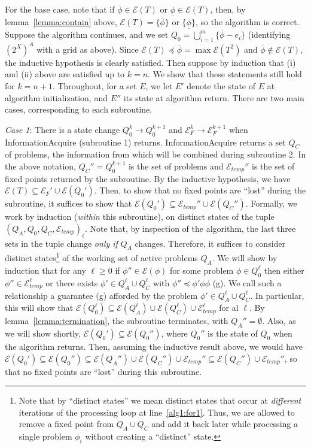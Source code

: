 \documentclass[11pt,reqno]{amsart}
\theoremstyle{definition}
\numberwithin{equation}{section}
\newcommand{\ol}{\overline}
\newcommand{\ul}{\underline}
\newcommand{\pre}{\phi}
\newcommand{\prealloc}{(2^X)^A}
\newcommand{\sub}{\subseteq}
\newcommand{\fix}{\mathcal{E}}
\newcommand{\peq}{\preceq}
\newcommand{\toppre}{\ol{\pre}}
\newcommand{\acto}{Q_0}
\newcommand{\actok}{Q_0^k}
\newcommand{\acta}{Q_A}
\newcommand{\actc}{Q_C}
\newcommand{\fixfind}{\mathcal{E}_F}
\newcommand{\fixfindk}{\mathcal{E}^k_F}
\newcommand{\fixfindkk}{\mathcal{E}^{k + 1}_F}
\newcommand{\fixtemp}{\mathcal{E}_{temp}}
\begin{document}
\begin{enumerate}
For the base case, note that if $\toppre \in \fix(T)$ or $\ul{\pre} \in \fix(T)$, then, by lemma~\ref{lemma:contain} above, $\fix(T) = \{\toppre\}$ or $\{\ul{\pre}\}$, so the algorithm is correct. 
Suppose the algorithm continues, and we set $\acto = \bigcup_{i = 1}^m \{\toppre - e_i\}$ (identifying $\prealloc$ with a grid as above).
Since $\fix(T) \peq \toppre = \max \fix(T^2)$ and $\toppre \not \in \fix(T)$, the inductive hypothesis is clearly satisfied. 
Then suppose by induction that (i) and (ii) above are satisfied up to $k = n$.
We show that these statements still hold for $k = n +1$.
Throughout, for a set $E$, we let $E'$ denote the state of $E$ at algorithm initialization, and $E''$ its state at algorithm return.
There are two main cases, corresponding to each subroutine.

\emph{Case 1}: There is a state change $\actok \to \acto^{k +1}$ and $\fixfindk \to \fixfindkk$ when InformationAcquire (subroutine 1) returns.
InformationAcquire returns a set $\actc$ of problems, the information from which will be combined during subroutine 2.
In the above notation, $\actc'' = \acto^{k+1}$ is the set of problems and $\fixtemp''$ is the set of fixed points returned by the subroutine.
By the inductive hypothesis, we have $\fix(T) \sub \fixfind' \cup \fix(\acto')$.
Then, to show that no fixed points are ``lost'' during the subroutine, it suffices to show that $\fix(\acto') \sub \fixtemp'' \cup \fix(\actc'')$.
Formally, we work by induction (\emph{within} this subroutine), on distinct states of the tuple $(\acta,\acto,\actc,\fixtemp)_{\ell}$.
Note that, by inspection of the algorithm, the last three sets in the tuple change \emph{only if} $\acta$ changes. 
Therefore, it suffices to consider distinct states\footnote{Note that by ``distinct states'' we mean distinct states that occur at \emph{different} iterations of the processing loop at line~\ref{alg1:for1}.
Thus, we are allowed to remove a fixed point from $\acta \cup \actc$ and add it back later while processing a single problem $\pre_i$ without creating a ``distinct'' state.} of the working set of active problems $\acta$.
We will show by induction that for any $\ell \geq 0$ if $\pre'' \in \fix(\pre)$ for some problem $\pre \in \acto^{\ell}$ then either $\pre'' \in \fixtemp^{\ell}$ or there exists $\pre' \in \acta^{\ell} \cup \actc^{\ell}$ with $\pre'' \peq \pre' \pre \pre$ (g).
We call such a relationship a guarantee (g) afforded by the problem $\pre' \in \acta^{\ell} \cup \actc^{\ell}$.
In particular, this will show that $\fix(\acto^{\ell}) \sub \fix(\acta^{\ell}) \cup \fix(\actc^{\ell}) \cup \fixtemp^{\ell}$ for al $\ell$.
By lemma~\ref{lemma:termination}, the subroutine terminates, with $\acta'' = \emptyset$. 
Also, as we will show shortly, $\fix(\acto') \sub \fix(\acto'')$, where $\acto''$ is the state of $\acto$ when the algorithm returns. 
Then, assuming the inductive result above, we would have $\fix(\acto') \sub \fix(\acto'') \sub \fix(\acta'') \cup \fix(\actc'') \cup \fixtemp'' \sub \fix(\actc'') \cup \fixtemp''$, so that no fixed points are ``lost'' during this subroutine.


\end{enumerate}
\end{document}
